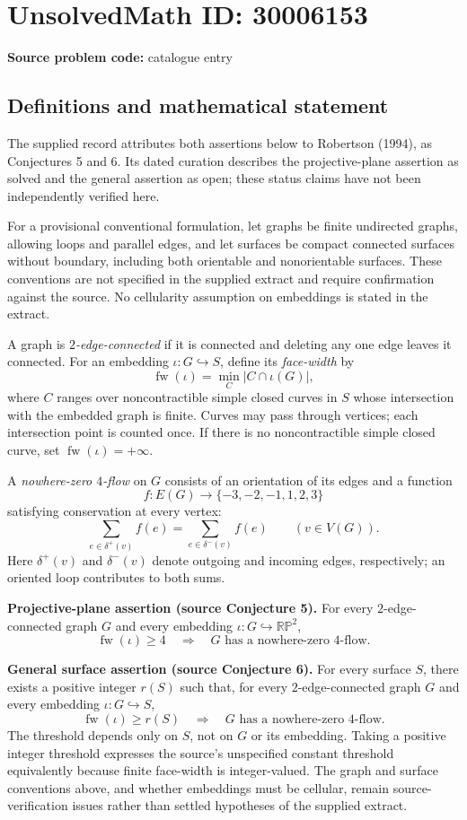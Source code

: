 \documentclass[11pt]{article}
\begin{document}
\section*{UnsolvedMath ID: 30006153}
\textbf{Source problem code:} catalogue entry
\subsection{Definitions and mathematical statement}
The supplied record attributes both assertions below to Robertson (1994), as Conjectures 5 and 6. Its dated curation describes the projective-plane assertion as solved and the general assertion as open; these status claims have not been independently verified here.

For a provisional conventional formulation, let graphs be finite undirected graphs, allowing loops and parallel edges, and let surfaces be compact connected surfaces without boundary, including both orientable and nonorientable surfaces. These conventions are not specified in the supplied extract and require confirmation against the source. No cellularity assumption on embeddings is stated in the extract.

A graph is \emph{$2$-edge-connected} if it is connected and deleting any one edge leaves it connected. For an embedding \(\iota:G\hookrightarrow S\), define its \emph{face-width} by
\[
\operatorname{fw}(\iota)=\min_C\bigl|C\cap\iota(G)\bigr|,
\]
where \(C\) ranges over noncontractible simple closed curves in \(S\) whose intersection with the embedded graph is finite. Curves may pass through vertices; each intersection point is counted once. If there is no noncontractible simple closed curve, set \(\operatorname{fw}(\iota)=+\infty\).

A \emph{nowhere-zero $4$-flow} on \(G\) consists of an orientation of its edges and a function
\[
f:E(G)\longrightarrow\{-3,-2,-1,1,2,3\}
\]
satisfying conservation at every vertex:
\[
\sum_{e\in\delta^+(v)}f(e)=\sum_{e\in\delta^-(v)}f(e)
\qquad(v\in V(G)).
\]
Here \(\delta^+(v)\) and \(\delta^-(v)\) denote outgoing and incoming edges, respectively; an oriented loop contributes to both sums.

\textbf{Projective-plane assertion (source Conjecture 5).} For every $2$-edge-connected graph \(G\) and every embedding \(\iota:G\hookrightarrow\mathbb{RP}^{2}\),
\[
\operatorname{fw}(\iota)\ge4
\quad\Longrightarrow\quad
G\text{ has a nowhere-zero }4\text{-flow}.
\]

\textbf{General surface assertion (source Conjecture 6).} For every surface \(S\), there exists a positive integer \(r(S)\) such that, for every $2$-edge-connected graph \(G\) and every embedding \(\iota:G\hookrightarrow S\),
\[
\operatorname{fw}(\iota)\ge r(S)
\quad\Longrightarrow\quad
G\text{ has a nowhere-zero }4\text{-flow}.
\]
The threshold depends only on \(S\), not on \(G\) or its embedding. Taking a positive integer threshold expresses the source's unspecified constant threshold equivalently because finite face-width is integer-valued. The graph and surface conventions above, and whether embeddings must be cellular, remain source-verification issues rather than settled hypotheses of the supplied extract.
\end{document}
